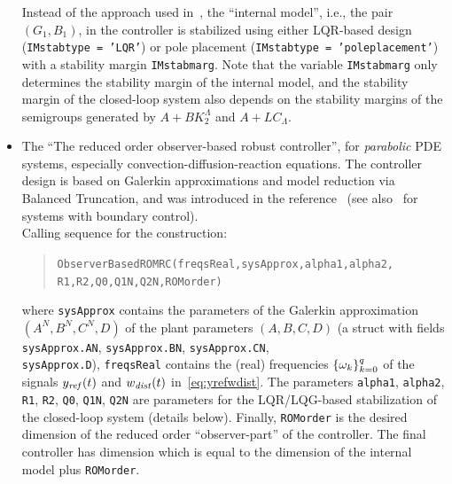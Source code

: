 \documentclass[11pt, a4paper]{amsart}
\newcommand{\CL}{C_\Lambda}
\theoremstyle{definition}
\numberwithin{equation}{section}
\newcommand{\yref}{y_{\mbox{\scriptsize\textit{ref}}}}
\newcommand{\wdist}{w_{\mbox{\scriptsize\textit{dist}}}}
\begin{document}
\begin{itemize}
     Instead of the approach used in~\cite{Pau16a}, the ``internal model'', i.e., the pair $(G_1,B_1)$, in the controller is stabilized using either LQR-based design (\texttt{IMstabtype = 'LQR'}) or pole placement (\texttt{IMstabtype = 'poleplacement'}) with a stability margin \texttt{IMstabmarg}. Note that the variable \texttt{IMstabmarg} only determines the stability margin of the internal model, and the stability margin of the closed-loop system also depends on the stability margins of the semigroups generated by $A+BK_2^\Lambda$ and $A+L\CL$.
     
     \bigskip
     
\item 
The ``The reduced order observer-based robust controller'', for \emph{parabolic} PDE systems, especially convection-diffusion-reaction equations. The controller design is based on Galerkin approximations and model reduction via Balanced Truncation, and was introduced in the reference~\cite{PauPha20} (see also~\cite{PhaPau21} for systems with boundary control).\\[1ex]
      Calling sequence for the construction:\\[-1ex]
     \begin{quotation}
       \hspace{-1cm}\texttt{ObserverBasedROMRC(freqsReal,sysApprox,alpha1,alpha2,\\ 
	 \phantom{a}\hspace{3.0cm} R1,R2,Q0,Q1N,Q2N,ROMorder)}
     \end{quotation}
     \medskip
     where \texttt{sysApprox} contains the parameters of the Galerkin approximation $(A^N,B^N,C^N,D)$ of the plant parameters $(A,B,C,D)$ (a struct with fields \texttt{sysApprox.AN}, \texttt{sysApprox.BN}, \texttt{sysApprox.CN}, \\ \texttt{sysApprox.D}), \texttt{freqsReal} contains the (real) frequencies $\{\omega_k\}_{k=0}^q$ of the signals $\yref(t)$ and $\wdist(t)$ in~\eqref{eq:yrefwdist}.
The parameters \texttt{alpha1}, \texttt{alpha2},
\texttt{R1}, \texttt{R2}, \texttt{Q0}, \texttt{Q1N}, \texttt{Q2N} are parameters for the LQR/LQG-based stabilization of the closed-loop system (details below). Finally, \texttt{ROMorder} is the desired dimension of the reduced order ``observer-part'' of the controller. The final controller has dimension which is equal to the dimension of the internal model plus \texttt{ROMorder}.


\end{itemize}
\end{document}
